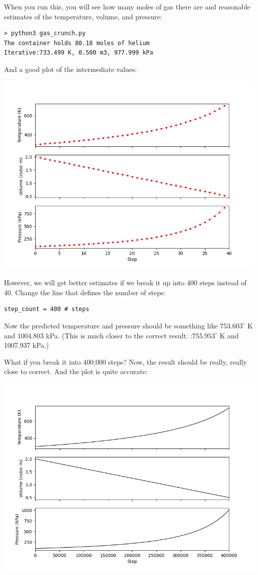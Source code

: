 When you run this, you will see how many moles of gas there are and reasonable estimates of the temperature, volume, and pressure:

\begin{Verbatim}
> python3 gas_crunch.py      
The container holds 80.18 moles of helium
Iterative:733.499 K, 0.500 m3, 977.999 kPa
\end{Verbatim}

And a good plot of the intermediate values:

\includegraphics[width=\textwidth]{chunkplot1.png}

However, we will get better estimates if we break it up into 400 steps instead of 40. Change the line that defines the number of steps:

\begin{Verbatim}
step_count = 400 # steps
\end{Verbatim}

Now the predicted temperature and pressure should be something like $753.603^\circ$ K and 1004.803 kPa.  (This is much closer to the correct result: :$755.953^\circ$ K and 1007.937 kPa.)

What if you break it into 400,000 steps? Now, the result should be really, really close to correct. And the plot is quite accurate:

\includegraphics[width=\textwidth]{chunkplot2.png}

